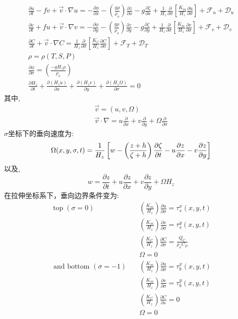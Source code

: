 \documentclass[a3paper,12pt]{article}
\newcommand*{\p}[2]{\frac{\partial #1}{\partial #2}}
\begin{document}
        \begin{gather}
            \frac{\partial u}{\partial t}-f v+\vec{v} \cdot \nabla u=-\frac{\partial \phi}{\partial x}-\left(\frac{g \rho}{\rho_{o}}\right) \frac{\partial z}{\partial x}-g \frac{\partial \zeta}{\partial x}+\frac{1}{H_{z}} \frac{\partial}{\partial \sigma}\left[\frac{K_{m}}{H_{z}} \frac{\partial u}{\partial \sigma}\right]+\mathcal{F}_{u}+\mathcal{D}_{u} \\
            \frac{\partial v}{\partial t}+f u+\vec{v} \cdot \nabla v=-\frac{\partial \phi}{\partial y}-\left(\frac{g \rho}{\rho_{o}}\right) \frac{\partial z}{\partial y}-g \frac{\partial \zeta}{\partial y}+\frac{1}{H_{z}} \frac{\partial}{\partial \sigma}\left[\frac{K_{m}}{H_{z}} \frac{\partial v}{\partial \sigma}\right]+\mathcal{F}_{v}+\mathcal{D}_{v} \\
            \frac{\partial C}{\partial t}+\vec{v} \cdot \nabla C=\frac{1}{H_{z}} \frac{\partial}{\partial \sigma}\left[\frac{K_{C}}{H_{z}} \frac{\partial C}{\partial \sigma}\right]+\mathcal{F}_{T}+\mathcal{D}_{T} \\
            \rho=\rho(T, S, P) \\
            \frac{\partial \phi}{\partial \sigma}=\left(\frac{-g H_{z} \rho}{\rho_{o}}\right) \\
            \frac{\partial H_{z}}{\partial t}+\frac{\partial\left(H_{z} u\right)}{\partial x}+\frac{\partial\left(H_{z} v\right)}{\partial y}+\frac{\partial\left(H_{z} \Omega\right)}{\partial \sigma}=0
            \end{gather}
    其中,
    \begin{gather*}
        \vec{v}=(u,v,\Omega)\\
        \vec{v}\cdot\nabla=u\p{}{x}+v\p{}{y}+\Omega\p{}{\sigma}
    \end{gather*}
    $\sigma$坐标下的垂向速度为:
    \[
        \Omega(x,y,\sigma,t)={1\over {H_z}}\left[w-\left({{z+h}\over{\zeta+h}}\right)\p{\zeta}{t}-u\p{z}{x}-v\p{z}{y}\right]
    \]
    以及,
    \[
        w=\p{z}{t}+u\p{z}{x}+v\p{z}{y}+\Omega H_z
    \]
    在拉伸坐标系下，垂向边界条件变为:
    \[
        \begin{aligned}
            \operatorname{top}(\sigma=0) \quad&\left(\frac{K_{m}}{H_{z}}\right) \frac{\partial u}{\partial \sigma}=\tau_{s}^{x}(x, y, t) \\
            &\left(\frac{K_{m}}{H_{z}}\right) \frac{\partial v}{\partial \sigma}=\tau_{s}^{y}(x, y, t) \\
            &\left(\frac{K_{C}}{H_{z}}\right) \frac{\partial C}{\partial \sigma}=\frac{Q_{C}}{\rho_{o} C_{P}} \\
            & \Omega=0 \\
            \text { and bottom }(\sigma=-1) \quad&\left(\frac{K_{m}}{H_{z}}\right) \frac{\partial u}{\partial \sigma}=\tau_{b}^{x}(x, y, t) \\
            &\left(\frac{K_{m}}{H_{z}}\right) \frac{\partial v}{\partial \sigma}=\tau_{b}^{y}(x, y, t) \\
            &\left(\frac{K_{C}}{H_{z}}\right) \frac{\partial C}{\partial s}=0 \\
            & \Omega=0
            \end{aligned}
    \]
\end{document}

